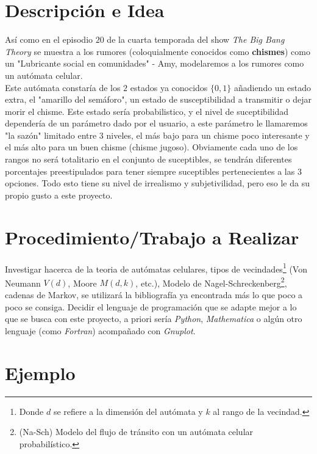 \vspace{0.5cm}

\section*{Descripción e Idea}

\noindent Así como en el episodio $20$ de la cuarta temporada del show \textit{The Big Bang Theory} se muestra a los rumores (coloquialmente conocidos como \textbf{chismes}) como un "Lubricante social en comunidades" - Amy, modelaremos a los rumores como un autómata celular. \\


\noindent Este autómata constaría de los $2$ estados ya conocidos $\{ 0,1 \}$ añadiendo un estado extra, el "amarillo del semáforo", un estado de susceptibilidad a transmitir o dejar morir el chisme. Este estado sería probabilistico, y el nivel de suceptibilidad dependería de un parámetro dado por el usuario, a este parámetro le llamaremos "la sazón" limitado entre $3$ niveles, el más bajo para un chisme poco interesante y el más alto para un buen chisme (chisme jugoso). Obviamente cada uno de los rangos no será totalitario en el conjunto de suceptibles, se tendrán diferentes porcentajes preestipulados para tener siempre suceptibles pertenecientes a las $3$ opciones. Todo esto tiene su nivel de irrealismo y subjetivilidad, pero eso le da su propio gusto a este proyecto.



\section*{Procedimiento/Trabajo a Realizar}

\noindent Investigar hacerca de la teoria de autómatas celulares, tipos de vecindades\footnote{Donde $d$ se refiere a la dimensión del autómata y $k$ al rango de la vecindad.} (Von Neumann $V(d)$, Moore $M(d,k)$, etc.), Modelo de Nagel-Schreckenberg\footnote{(Na-Sch) Modelo del flujo de tránsito con un autómata celular probabilístico.}, cadenas de Markov, se utilizará la bibliografía ya encontrada más lo que poco a poco se consiga. Decidir el lenguaje de programación que se adapte mejor a lo que se busca con este proyecto, a priori sería \textit{Python}, \textit{Mathematica} o algún otro lenguaje (como \textit{Fortran}) acompañado con \textit{Gnuplot}. 


\section*{Ejemplo}


